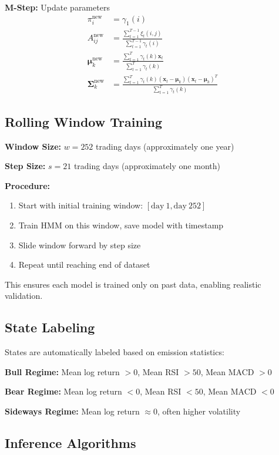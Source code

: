 \documentclass[conference]{IEEEtran}
\begin{document}
\textbf{M-Step:} Update parameters
\begin{align}
\pi_i^{\text{new}} &= \gamma_1(i) \\
A_{ij}^{\text{new}} &= \frac{\sum_{t=1}^{T-1}\xi_t(i,j)}{\sum_{t=1}^{T-1}\gamma_t(i)} \\
\boldsymbol{\mu}_k^{\text{new}} &= \frac{\sum_{t=1}^{T}\gamma_t(k)\mathbf{x}_t}{\sum_{t=1}^{T}\gamma_t(k)} \\
\boldsymbol{\Sigma}_k^{\text{new}} &= \frac{\sum_{t=1}^{T}\gamma_t(k)(\mathbf{x}_t - \boldsymbol{\mu}_k)(\mathbf{x}_t - \boldsymbol{\mu}_k)^T}{\sum_{t=1}^{T}\gamma_t(k)}
\end{align}

\subsection{Rolling Window Training}

\textbf{Window Size:} $w = 252$ trading days (approximately one year)

\textbf{Step Size:} $s = 21$ trading days (approximately one month)

\textbf{Procedure:}
\begin{enumerate}
\item Start with initial training window: $[\text{day}\ 1, \text{day}\ 252]$
\item Train HMM on this window, save model with timestamp
\item Slide window forward by step size
\item Repeat until reaching end of dataset
\end{enumerate}

This ensures each model is trained only on past data, enabling realistic validation.

\subsection{State Labeling}

States are automatically labeled based on emission statistics:

\textbf{Bull Regime:} Mean log return $> 0$, Mean RSI $> 50$, Mean MACD $> 0$

\textbf{Bear Regime:} Mean log return $< 0$, Mean RSI $< 50$, Mean MACD $< 0$

\textbf{Sideways Regime:} Mean log return $\approx 0$, often higher volatility

\subsection{Inference Algorithms}
\end{document}
